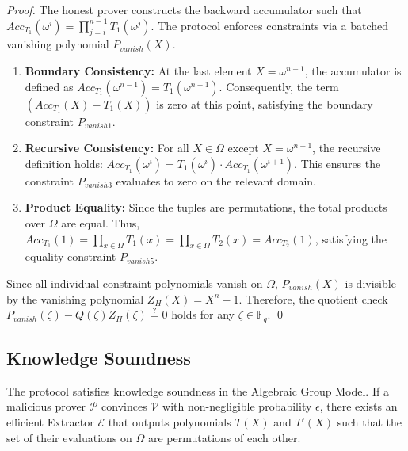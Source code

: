 \begin{proof}
    The honest prover constructs the backward accumulator such that $Acc_{T_1}(\omega^i) = \prod_{j=i}^{n-1} T_1(\omega^j)$. The protocol enforces constraints via a batched vanishing polynomial $P_{vanish}(X)$.
    \begin{enumerate}
        \item \textbf{Boundary Consistency:} At the last element $X = \omega^{n-1}$, the accumulator is defined as $Acc_{T_1}(\omega^{n-1}) = T_1(\omega^{n-1})$. Consequently, the term $(Acc_{T_1}(X) - T_1(X))$ is zero at this point, satisfying the boundary constraint $P_{vanish1}$.
        \item \textbf{Recursive Consistency:} For all $X \in \Omega$ except $X=\omega^{n-1}$, the recursive definition holds: $Acc_{T_1}(\omega^i) = T_1(\omega^i) \cdot Acc_{T_1}(\omega^{i+1})$. This ensures the constraint $P_{vanish3}$ evaluates to zero on the relevant domain.
        \item \textbf{Product Equality:} Since the tuples are permutations, the total products over $\Omega$ are equal. Thus, $Acc_{T_1}(1) = \prod_{x \in \Omega} T_1(x) = \prod_{x \in \Omega} T_2(x) = Acc_{T_2}(1)$, satisfying the equality constraint $P_{vanish5}$.
    \end{enumerate}
    Since all individual constraint polynomials vanish on $\Omega$, $P_{vanish}(X)$ is divisible by the vanishing polynomial $Z_H(X) = X^n - 1$. Therefore, the quotient check $P_{vanish}(\zeta) - Q(\zeta)Z_H(\zeta) \stackrel{?}{=} 0$ holds for any $\zeta \in \mathbb{F}_q$.
    \qed
\end{proof}

\subsection{Knowledge Soundness}

\begin{theorem}
    The protocol satisfies knowledge soundness in the Algebraic Group Model. If a malicious prover ${\mathcal{P}}$ convinces $\mathcal{V}$ with non-negligible probability $\epsilon$, there exists an efficient Extractor $\mathcal{E}$ that outputs polynomials $T(X)$ and $T'(X)$ such that the set of their evaluations on $\Omega$ are permutations of each other.
\end{theorem}

